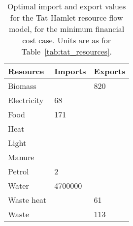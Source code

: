 \begin{table}[h]
	\centering
	\caption{Optimal import and export values for the Tat Hamlet resource flow model, for the minimum financial cost case. Units are as for Table~\ref{tab:tat_resources}.} \label{tab:tat_basic_results}
	\begin{tabular}{lll}
		\toprule
		Resource  & Imports & Exports \\
		\midrule
		Biomass & & 820 \\
		Electricity & 68 & \\
		Food & 171 & \\
		Heat & & \\
		Light & & \\
		Manure & & \\
		Petrol & 2 & \\
		Water & 4700000 & \\
		Waste heat & & 61 \\
		Waste & & 113 \\
		\bottomrule
	\end{tabular}
\end{table}

